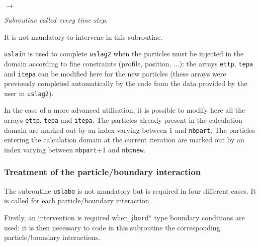 {{{{\begin{list}{$\rightarrow$}{}
\end{list}
}


\noindent
\textit{Subroutine called every time step.}

\noindent
It is not mandatory to intervene in this subroutine.

\noindent
\texttt{uslain} is used to complete \texttt{uslag2} when the particles
must be injected in the domain according to fine constraints (profile,
position, ...): the arrays \texttt{ettp}, \texttt{tepa} and \texttt{itepa}
can be modified here for the new particles (these arrays were previously
completed automatically by the code from the data provided by the user
in \texttt{uslag2}).

\noindent
In the case of a more advanced utilisation, it is possible to modify
here all the arrays \texttt{ettp}, \texttt{tepa} and \texttt{itepa}.
The particles already present in the calculation domain are marked out
by an index varying between 1 and \texttt{nbpart}. The particles entering
the calculation domain at the current iteration are marked out by an index
varying between \texttt{nbpart}+1 and \texttt{nbpnew}.

\clearpage

\subsubsection{Treatment of the particle/boundary interaction}

\noindent
The subroutine \texttt{uslabo} is not mandatory but is required in four different
 cases. It is called for each particle/boundary interaction.

\noindent
Firstly, an intervention is required when \texttt{jbord}* type boundary
conditions are used: it is then necessary to code in this subroutine the
corresponding particle/boundary interactions.

}}}
